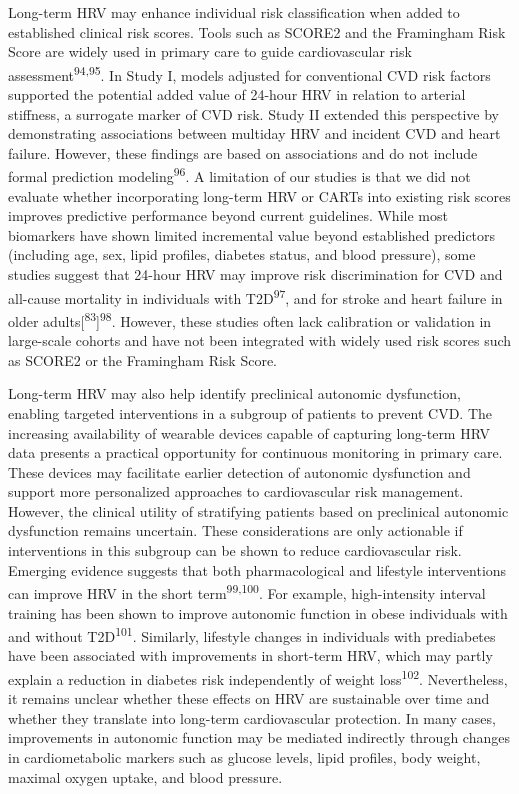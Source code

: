 \documentclass[
  a4paper,
  headsepline=true,
  open=any]{scrbook}
\begin{document}
Long-term HRV may enhance individual risk classification when added to
established clinical risk scores. Tools such as SCORE2 and the
Framingham Risk Score are widely used in primary care to guide
cardiovascular risk assessment\textsuperscript{94,95}. In Study I,
models adjusted for conventional CVD risk factors supported the
potential added value of 24-hour HRV in relation to arterial stiffness,
a surrogate marker of CVD risk. Study II extended this perspective by
demonstrating associations between multiday HRV and incident CVD and
heart failure. However, these findings are based on associations and do
not include formal prediction modeling\textsuperscript{96}. A limitation
of our studies is that we did not evaluate whether incorporating
long-term HRV or CARTs into existing risk scores improves predictive
performance beyond current guidelines. While most biomarkers have shown
limited incremental value beyond established predictors (including age,
sex, lipid profiles, diabetes status, and blood pressure), some studies
suggest that 24-hour HRV may improve risk discrimination for CVD and
all-cause mortality in individuals with T2D\textsuperscript{97}, and for
stroke and heart failure in older
adults{[}\textsuperscript{83}{]}\textsuperscript{98}. However, these
studies often lack calibration or validation in large-scale cohorts and
have not been integrated with widely used risk scores such as SCORE2 or
the Framingham Risk Score.

Long-term HRV may also help identify preclinical autonomic dysfunction,
enabling targeted interventions in a subgroup of patients to prevent
CVD. The increasing availability of wearable devices capable of
capturing long-term HRV data presents a practical opportunity for
continuous monitoring in primary care. These devices may facilitate
earlier detection of autonomic dysfunction and support more personalized
approaches to cardiovascular risk management. However, the clinical
utility of stratifying patients based on preclinical autonomic
dysfunction remains uncertain. These considerations are only actionable
if interventions in this subgroup can be shown to reduce cardiovascular
risk. Emerging evidence suggests that both pharmacological and lifestyle
interventions can improve HRV in the short term\textsuperscript{99,100}.
For example, high-intensity interval training has been shown to improve
autonomic function in obese individuals with and without
T2D\textsuperscript{101}. Similarly, lifestyle changes in individuals
with prediabetes have been associated with improvements in short-term
HRV, which may partly explain a reduction in diabetes risk independently
of weight loss\textsuperscript{102}. Nevertheless, it remains unclear
whether these effects on HRV are sustainable over time and whether they
translate into long-term cardiovascular protection. In many cases,
improvements in autonomic function may be mediated indirectly through
changes in cardiometabolic markers such as glucose levels, lipid
profiles, body weight, maximal oxygen uptake, and blood pressure.
\end{document}
